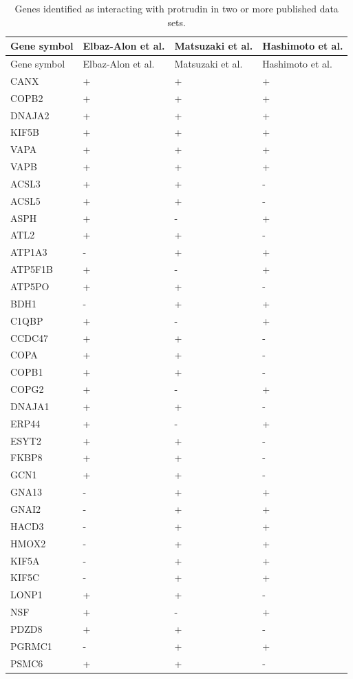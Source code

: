 \documentclass[
  12pt,
  a4paper,
]{book}
\begin{document}
\begin{longtable}[]{@{}llll@{}}
\caption{\label{tab:overlap-table}Genes identified as interacting with protrudin in two or more published data sets.}\tabularnewline
\toprule()
Gene symbol & Elbaz-Alon et al. & Matsuzaki et al. & Hashimoto et al. \\
\midrule()
\endfirsthead
\toprule()
Gene symbol & Elbaz-Alon et al. & Matsuzaki et al. & Hashimoto et al. \\
\midrule()
\endhead
CANX & + & + & + \\
COPB2 & + & + & + \\
DNAJA2 & + & + & + \\
KIF5B & + & + & + \\
VAPA & + & + & + \\
VAPB & + & + & + \\
ACSL3 & + & + & - \\
ACSL5 & + & + & - \\
ASPH & + & - & + \\
ATL2 & + & + & - \\
ATP1A3 & - & + & + \\
ATP5F1B & + & - & + \\
ATP5PO & + & + & - \\
BDH1 & - & + & + \\
C1QBP & + & - & + \\
CCDC47 & + & + & - \\
COPA & + & + & - \\
COPB1 & + & + & - \\
COPG2 & + & - & + \\
DNAJA1 & + & + & - \\
ERP44 & + & - & + \\
ESYT2 & + & + & - \\
FKBP8 & + & + & - \\
GCN1 & + & + & - \\
GNA13 & - & + & + \\
GNAI2 & - & + & + \\
HACD3 & - & + & + \\
HMOX2 & - & + & + \\
KIF5A & - & + & + \\
KIF5C & - & + & + \\
LONP1 & + & + & - \\
NSF & + & - & + \\
PDZD8 & + & + & - \\
PGRMC1 & - & + & + \\
PSMC6 & + & + & - \\

\end{longtable}
\end{document}
